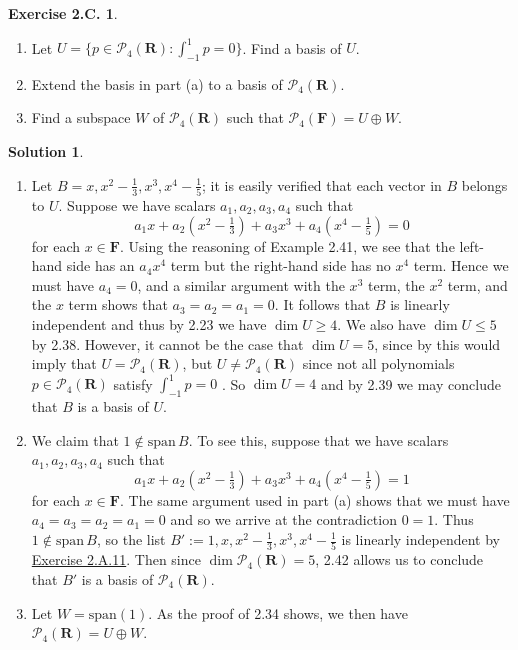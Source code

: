 \documentclass[12pt]{article}
\theoremstyle{definition}
\theoremstyle{exercise}
\newtheorem{exercise}{Exercise 2.C.}
\theoremstyle{solution}
\newtheorem*{solution}{Solution}
\newcommand{\poly}{\mathcal{P}}
\newcommand{\Span}{\text{span}}
\newcommand{\R}{\mathbf{R}}
\newcommand{\F}{\mathbf{F}}
\begin{document}
\begin{exercise}
\label{ex:8}
    \begin{enumerate}
        \item Let \( U = \{ p \in \poly_4(\R) : \int_{-1}^1 p = 0 \} \). Find a basis of \( U \).

        \item Extend the basis in part (a) to a basis of \( \poly_4(\R) \).

        \item Find a subspace \( W \) of \( \poly_4(\R) \) such that \( \poly_4(\F) = U \oplus W \).
    \end{enumerate}
\end{exercise}
    
\begin{solution}
    \begin{enumerate}
        \item Let \( B = x, x^2 - \tfrac{1}{3}, x^3, x^4 - \tfrac{1}{5} \); it is easily verified that each vector in \( B \) belongs to \( U \). Suppose we have scalars \( a_1, a_2, a_3, a_4 \) such that
        \[
            a_1 x + a_2 (x^2 - \tfrac{1}{3}) + a_3 x^3 + a_4 (x^4 - \tfrac{1}{5}) = 0
        \]
        for each \( x \in \F \). Using the reasoning of Example 2.41, we see that the left-hand side has an \( a_4 x^4 \) term but the right-hand side has no \( x^4 \) term. Hence we must have \( a_4 = 0 \), and a similar argument with the \( x^3 \) term, the \( x^2 \) term, and the \( x \) term shows that \( a_3 = a_2 = a_1 = 0 \). It follows that \( B \) is linearly independent and thus by 2.23 we have \( \dim U \geq 4 \). We also have \( \dim U \leq 5 \) by 2.38. However, it cannot be the case that \( \dim U = 5 \), since by  this would imply that \( U = \poly_4(\R) \), but \( U \neq \poly_4(\R) \) since not all polynomials \( p \in \poly_4(\R) \) satisfy \( \int_{-1}^1 p = 0 \) . So \( \dim U = 4 \) and by 2.39 we may conclude that \( B \) is a basis of \( U \).

        \item We claim that \( 1 \not\in \Span\,B \). To see this, suppose that we have scalars \( a_1, a_2, a_3, a_4 \) such that
        \[
            a_1 x + a_2 (x^2 - \tfrac{1}{3}) + a_3 x^3 + a_4 (x^4 - \tfrac{1}{5}) = 1
        \]
        for each \( x \in \F \). The same argument used in part (a) shows that we must have \( a_4 = a_3 = a_2 = a_1 = 0 \) and so we arrive at the contradiction \( 0 = 1 \). Thus \( 1 \not\in \Span\,B \), so the list \( B' := 1, x, x^2 - \tfrac{1}{3}, x^3, x^4 - \tfrac{1}{5} \) is linearly independent by \href{https://lew98.github.io/Mathematics/LADR_Section_2_A_Exercises.pdf}{Exercise 2.A.11}. Then since \( \dim \poly_4(\R) = 5 \), 2.42 allows us to conclude that \( B' \) is a basis of \( \poly_4(\R) \).

        \item Let \( W = \Span(1) \). As the proof of 2.34 shows, we then have \( \poly_4(\R) = U \oplus W \).
    \end{enumerate}
\end{solution}
\end{document}
